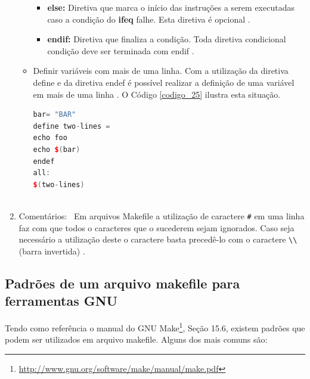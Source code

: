 \begin{enumerate}
\begin{itemize}
\begin{itemize}
        \item \textbf{else:} Diretiva que marca o início das instruções a serem 
    executadas caso a condição do \textbf{ifeq} falhe. Esta diretiva é opcional \cite{ref50}.

        \item \textbf{endif:} Diretiva que finaliza a condição. 
    Toda diretiva condicional condição deve ser terminada com endif \cite{ref50}.
    \end{itemize}

    \item Definir variáveis com mais de uma linha. Com a utilização da diretiva define
 e  da diretiva endef é possível realizar a definição de uma variável em mais
 de uma linha \cite{ref51}. O Código \ref{codigo_25} ilustra esta situação.

    \begin{lstlisting}[language=C++,caption={
			 	Makefile com definição de variável em múltiplas linhas},
														label=codigo_25]
bar= "BAR"
define two-lines =
echo foo
echo $(bar)
endef
all:
$(two-lines)
    
    \end{lstlisting}


    \end{itemize}

    \item Comentários: \
Em arquivos Makefile a utilização de caractere \texttt{\#} em uma linha faz com
 que todos o caracteres que o sucederem sejam ignorados. Caso seja necessário
 a utilização deste o caractere basta precedê-lo com o caractere \texttt{\textbackslash\textbackslash} (barra invertida) \cite{ref48}.

\end{enumerate}


\subsection{Padrões de um arquivo makefile para ferramentas GNU}

    
Tendo como referência o manual do GNU Make\footnote{
\url{http://www.gnu.org/software/make/manual/make.pdf}},
Seção 15.6, existem padrões que podem ser utilizados em arquivo
 makefile. Alguns dos mais comuns são:

